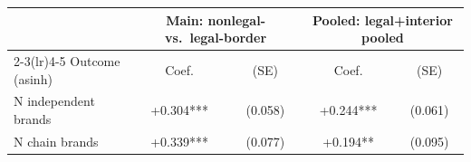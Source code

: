 \begin{tabular}{@{}lcccc@{}}
\toprule
 & \multicolumn{2}{c}{Main: nonlegal- vs.\ legal-border} & \multicolumn{2}{c}{Pooled: legal+interior pooled} \\
\cmidrule(lr){2-3}\cmidrule(lr){4-5}
Outcome (asinh) & Coef. & (SE) & Coef. & (SE) \\
\midrule
N independent brands & +0.304*** & (0.058) & +0.244*** & (0.061) \\
N chain brands & +0.339*** & (0.077) & +0.194** & (0.095) \\
\bottomrule
\end{tabular}
